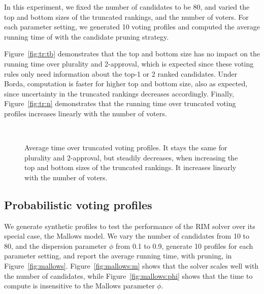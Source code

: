  In this experiment, we fixed the number of candidates to be 80, and varied the top and bottom sizes of the truncated rankings, and the number of voters.
For each parameter setting, we generated 10 voting profiles and computed the average running time of \mew with the candidate pruning strategy. 

Figure~\ref{fig:tr:tb} demonstrates that the top and bottom size has no impact on the running time over plurality and 2-approval, which is expected since these voting rules only need information about the top-1 or 2 ranked candidates. Under Borda, \mew computation is faster for higher top and bottom size, also as expected, since uncertainty in the truncated rankings decreases accordingly.  Finally, Figure~\ref{fig:tr:n} demonstrates that the running time over truncated voting profiles increases linearly with the number of voters.

\begin{figure}[tb!]
	\centering
	\hspace{5em}
	~
	\caption{Average time over truncated voting profiles. It stays the same for plurality and 2-approval, but steadily decreases, when increasing the top and bottom sizes of the truncated rankings. It increases linearly with the number of voters.}
	\label{fig:tr}
\end{figure}

\subsection{Probabilistic voting profiles}

We generate synthetic profiles to test the performance of the RIM solver over its special case, the Mallows model.  We vary the number of candidates from 10 to 80, and the dispersion parameter $\phi$ from 0.1 to 0.9, generate 10 profiles for each parameter setting, and report the average running time, with pruning, in Figure~\ref{fig:mallows}.
Figure~\ref{fig:mallows:m} shows that the solver scales well with the number of candidates, while Figure~\ref{fig:mallows:phi} shows that the time to compute \mew is insensitive to the Mallows parameter $\phi$.

